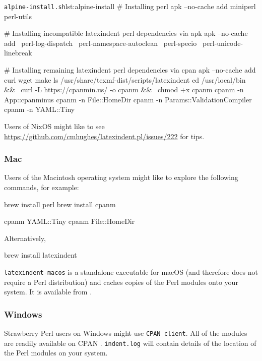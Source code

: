    \begin{cmhlistings}[style=tcblatex,language=Bash]{\texttt{alpine-install.sh}}{lst:alpine-install}
# Installing perl
apk --no-cache add miniperl perl-utils

# Installing incompatible latexindent perl dependencies via apk
apk --no-cache add \
    perl-log-dispatch \
    perl-namespace-autoclean \
    perl-specio \
    perl-unicode-linebreak

# Installing remaining latexindent perl dependencies via cpan
apk --no-cache add curl wget make
ls /usr/share/texmf-dist/scripts/latexindent
cd /usr/local/bin && \
    curl -L https://cpanmin.us/ -o cpanm && \
    chmod +x cpanm
cpanm -n App::cpanminus
cpanm -n File::HomeDir
cpanm -n Params::ValidationCompiler
cpanm -n YAML::Tiny
\end{cmhlistings}

   Users of NixOS might like to see
   \href{https://github.com/cmhughes/latexindent.pl/issues/222}{https://github.com/cmhughes/latexindent.pl/issues/222}
   for tips.
 \subsubsection{Mac}
  Users of the Macintosh operating system might like to explore the following commands,
  for example:

  \begin{commandshell}
brew install perl
brew install cpanm

cpanm YAML::Tiny
cpanm File::HomeDir
\end{commandshell}

  Alternatively,

  \begin{commandshell}
brew install latexindent
\end{commandshell}

  \texttt{latexindent-macos} is a standalone executable  for macOS (and therefore does not require a Perl distribution)
  and caches copies of the Perl modules onto your system. It is available from \cite{latexindent-home}.
    

 \subsubsection{Windows}
  Strawberry Perl users on Windows might use \texttt{CPAN client}. All of the modules are
  readily available on CPAN \cite{cpan}. \texttt{indent.log} will contain details of the
  location of the Perl modules on your system.

